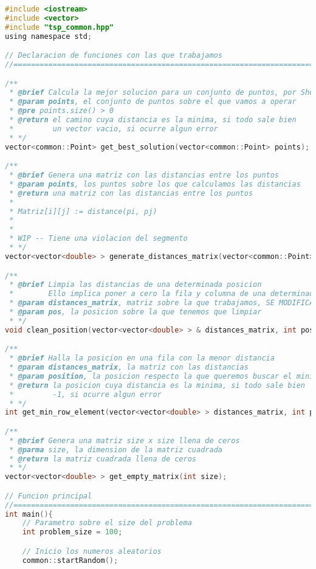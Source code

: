 \documentclass[10pt, a4paper]{article}
\theoremstyle{theorem-style}
\theoremstyle{theorem-style}
\theoremstyle{definition-style}
\theoremstyle{remark-style}
\theoremstyle{example-style}
\theoremstyle{definition-style}
\theoremstyle{remark-style}
\begin{document}
\begin{lstlisting}[language=C]
#include <iostream>
#include <vector>
#include "tsp_common.hpp"
using namespace std;

// Declaracion de funciones con las que trabajamos
//==============================================================================

/**
 * @brief Calcula la mejor solucion para un conjunto de puntos, por Shortest Neighbor First
 * @param points, el conjunto de puntos sobre el que vamos a operar
 * @pre points.size() > 0
 * @return el camino cuya distancia es la minima, si todo sale bien
 *         un vector vacio, si ocurre algun error
 * */
vector<common::Point> get_best_solution(vector<common::Point> points);

/**
 * @brief Genera una matriz con las distancias entre los puntos 
 * @param points, los puntos sobre los que calculamos las distancias
 * @return una matriz con las distancias entre los puntos
 *
 * Matriz[i][j] := distance(pi, pj)
 *
 *
 * WIP -- Tiene una violacion del segmento
 * */
vector<vector<double> > generate_distances_matrix(vector<common::Point> points);

/**
 * @brief Limpia las distancias de una determinada posicion
 *        Ello implica poner a cero la fila y columna de una determinada posicion
 * @param distances_matrix, matriz sobre la que trabajamos, SE MODIFICA
 * @param pos, la posicion sobre la que tenemos que limpiar
 * */
void clean_position(vector<vector<double> > & distances_matrix, int pos);

/**
 * @brief Halla la posicion en una fila con la menor distancia
 * @param distances_matrix, la matriz con las distancias
 * @param position, la posicion respecto la que queremos buscar el minimo elemento
 * @return la posicion cuya distancia es la minima, si todo sale bien
 *         -1, si ocurre algun error
 * */
int get_min_row_element(vector<vector<double> > distances_matrix, int position);

/**
 * @brief Genera una matriz size x size llena de ceros
 * @parma size, la dimension de la matriz cuadrada
 * @return la matriz cuadrada llena de ceros
 * */
vector<vector<double> > get_empty_matrix(int size);

// Funcion principal
//==============================================================================
int main(){
    // Parametro sobre el size del problema
    int problem_size = 100;

    // Inicio los numeros aleatorios
    common::startRandom();


\end{lstlisting}
\end{document}
